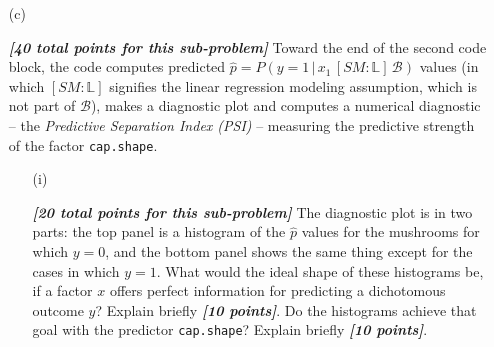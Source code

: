 \documentclass[12pt]{article}
\newcommand{\given}{\, | \,}
\newenvironment{solution}{\begin{tcolorbox}[breakable]\begin{proof}[\textbf{\textit{Solution}}] }{\end{proof}\end{tcolorbox}}
\newcommand{\bi}[1]{\textbf{\textit{#1}}}
\begin{document}
\begin{itemize}
\begin{table}[t!]
\label{t:data-analysis-1}

\end{table}

\begin{solution}
    It is clear from the table that we get our $\hat{\beta}_j$ value from the "Estimate" column on the table. So,
    \[(\hat{\beta_1}, \hat{\beta_2} , \dots, \hat{\beta_5}) = (0.10619, 0.89381, 0.38746 , 0.61844 , -0.10619 ,0.36098  ).\]

    We see that $\hat{\beta_0}$ is equal to the mean about "poisonous" when cap shape is "b". This follows from (4) by,
    \[\hat{y_b} = 0.10619 + \hat{\beta_1}0 + \dots + \hat{\beta_5}0 = 0.10619\]

    To see the way it relates to the rest of the mean values relate to the rest of $\hat{\beta_j}$ let's look at when cap.shape $='c'$,
    \begin{align*}
        \hat{y_c} = 0.10619 + 0.89381\cdot 1  + \hat{\beta_2}\cdot 0 + \dots + \hat{\beta_5}\cdot 0 = 1
    \end{align*}
    which matches the mean table for mushroom cap $f$. Which means the relation is,
    \[E(y \given \text{cap.shape} = i) = \bar{y_i} = \hat{y_i}.\]
    More directly in terms of $\hat{\beta}_j$ the relation it is that $\hat{\beta_0}$ is equal to the mean $y$ in the omitted category. Then for $j \geq 1$ we have $\hat{\beta_j}$ is equal to the mean $y$ in category $j$ minus the mean $y$ in the omitted category. 
\end{solution}

\item[(c)]

\bi{[40 total points for this sub-problem]} Toward the end of the second code block, the code computes predicted $\hat{ p } = P ( y = 1 \given x_1 \, [ SM \! \! : \! \mathbb{ L } ] \, \mathcal{ B } )$ values (in which $[ SM \! \! : \! \mathbb{ L } ]$ signifies the linear regression modeling assumption, which is not part of $\mathcal{ B }$), makes a diagnostic plot and computes a numerical diagnostic -- the \textit{Predictive Separation Index (PSI)} -- measuring the predictive strength of the factor \texttt{cap.shape}.

\begin{itemize}

\item[(i)]

\bi{[20 total points for this sub-problem]} The diagnostic plot is in two parts: the top panel is a histogram of the $\hat{ p }$ values for the mushrooms for which $y = 0$, and the bottom panel shows the same thing except for the cases in which $y = 1$. What would the ideal shape of these histograms be, if a factor $x$ offers perfect information for predicting a dichotomous outcome $y$? Explain briefly \bi{[10 points]}. Do the histograms achieve that goal with the predictor \texttt{cap.shape}? Explain briefly \bi{[10 points]}.


\end{itemize}
\end{itemize}
\end{document}
